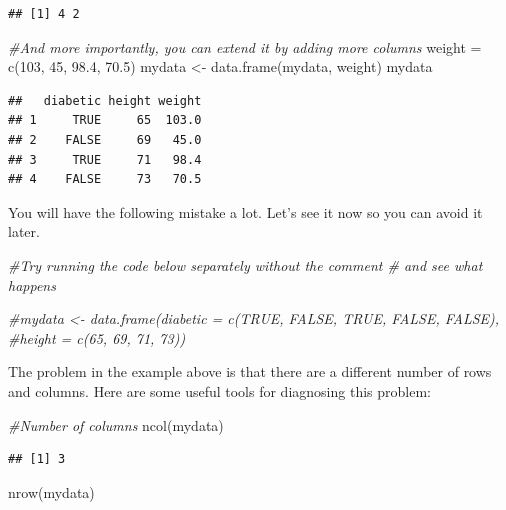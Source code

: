 \documentclass[
]{book}
\newenvironment{Shaded}{\begin{snugshade}}{\end{snugshade}}
\newcommand{\CommentTok}[1]{\textcolor[rgb]{0.56,0.35,0.01}{\textit{#1}}}
\newcommand{\DecValTok}[1]{\textcolor[rgb]{0.00,0.00,0.81}{#1}}
\newcommand{\FloatTok}[1]{\textcolor[rgb]{0.00,0.00,0.81}{#1}}
\newcommand{\FunctionTok}[1]{\textcolor[rgb]{0.00,0.00,0.00}{#1}}
\newcommand{\NormalTok}[1]{#1}
\newcommand{\OtherTok}[1]{\textcolor[rgb]{0.56,0.35,0.01}{#1}}
\begin{document}
\begin{verbatim}
## [1] 4 2
\end{verbatim}

\begin{Shaded}
\begin{Highlighting}[]
\CommentTok{\#And more importantly, you can extend it by adding more columns}
\NormalTok{weight }\OtherTok{=} \FunctionTok{c}\NormalTok{(}\DecValTok{103}\NormalTok{, }\DecValTok{45}\NormalTok{, }\FloatTok{98.4}\NormalTok{, }\FloatTok{70.5}\NormalTok{)}
\NormalTok{mydata }\OtherTok{\textless{}{-}} \FunctionTok{data.frame}\NormalTok{(mydata, weight)}
\NormalTok{mydata}
\end{Highlighting}
\end{Shaded}

\begin{verbatim}
##   diabetic height weight
## 1     TRUE     65  103.0
## 2    FALSE     69   45.0
## 3     TRUE     71   98.4
## 4    FALSE     73   70.5
\end{verbatim}

You will have the following mistake a lot. Let's see it now so you can avoid it later.

\begin{Shaded}
\begin{Highlighting}[]
\CommentTok{\#Try running the code below separately without the comment \# and see what happens}

\CommentTok{\#mydata \textless{}{-} data.frame(diabetic = c(TRUE, FALSE, TRUE, FALSE, FALSE), }
                     \CommentTok{\#height = c(65, 69, 71, 73))}
\end{Highlighting}
\end{Shaded}

The problem in the example above is that there are a different number of rows and columns. Here are some useful tools for diagnosing this problem:

\begin{Shaded}
\begin{Highlighting}[]
\CommentTok{\#Number of columns}
\FunctionTok{ncol}\NormalTok{(mydata)}
\end{Highlighting}
\end{Shaded}

\begin{verbatim}
## [1] 3
\end{verbatim}

\begin{Shaded}
\begin{Highlighting}[]
\FunctionTok{nrow}\NormalTok{(mydata)}
\end{Highlighting}
\end{Shaded}
\end{document}
